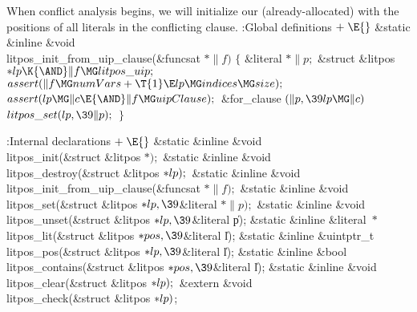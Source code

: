 {{{{{When conflict analysis begins, we will initialize our
(already-allocated)
 with the positions of all literals in the conflicting clause.
\Y\B\4:Global definitions\X${}\mathrel+\E{}$\6
\&{static} \&{inline} \&{void} \\{litpos\_init\_from\_uip\_clause}(\&{funcsat}
${}{*}\|f){}$\1\1\2\2\6
${}\{{}$\1\6
\&{literal} ${}{*}\|p;{}$\6
\&{struct} \&{litpos} ${}{*}\\{lp}\K{\AND}\|f\MG\\{litpos\_uip};{}$\7
${}\\{assert}(\|f\MG\\{numVars}+\T{1}\E\\{lp}\MG\\{indices}\MG\\{size});{}$\6
${}\\{assert}(\\{lp}\MG\|c\E{\AND}\|f\MG\\{uipClause});{}$\6
\&{for\_clause} ${}(\|p,\39\\{lp}\MG\|c){}$\1\5
${}\\{litpos\_set}(\\{lp},\39\|p);{}$\2\6
\4${}\}{}$\2\par
\fi

\Y\B\4:Internal declarations\X${}\mathrel+\E{}$\6
\&{static} \&{inline} \&{void} \\{litpos\_init}(\&{struct} \&{litpos}
${}{*});{}$\6
\&{static} \&{inline} \&{void} \\{litpos\_destroy}(\&{struct} \&{litpos} ${}{*}%
\\{lp});{}$\6
\&{static} \&{inline} \&{void} \\{litpos\_init\_from\_uip\_clause}(\&{funcsat}
${}{*}\|f);{}$\6
\&{static} \&{inline} \&{void} \\{litpos\_set}(\&{struct} \&{litpos} ${}{*}%
\\{lp},\39{}$\&{literal} ${}{*}\|p);{}$\6
\&{static} \&{inline} \&{void} \\{litpos\_unset}(\&{struct} \&{litpos} ${}{*}%
\\{lp},\39{}$\&{literal} \|p);\6
\&{static} \&{inline} \&{literal} ${}{*}{}$\\{litpos\_lit}(\&{struct} %
\&{litpos} ${}{*}\\{pos},\39{}$\&{literal} \|l);\6
\&{static} \&{inline} \&{uintptr\_t} \\{litpos\_pos}(\&{struct} \&{litpos}
${}{*}\\{lp},\39{}$\&{literal} \|l);\6
\&{static} \&{inline} \&{bool} \\{litpos\_contains}(\&{struct} \&{litpos}
${}{*}\\{pos},\39{}$\&{literal} \|l);\6
\&{static} \&{inline} \&{void} \\{litpos\_clear}(\&{struct} \&{litpos} ${}{*}%
\\{lp});{}$\6
\&{extern} \&{void} \\{litpos\_check}(\&{struct} \&{litpos} ${}{*}\\{lp}){}$;%
\par
\fi

}}}}}
